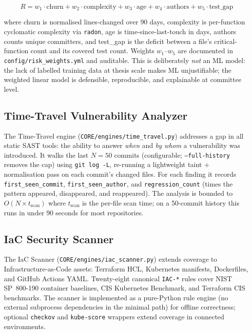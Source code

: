 \begin{equation}
R = w_1 \cdot \text{churn} + w_2 \cdot \text{complexity} + w_3 \cdot \text{age} + w_4 \cdot \text{authors} + w_5 \cdot \text{test\_gap}
\end{equation}

where churn is normalised lines-changed over 90 days, complexity is per-function cyclomatic complexity via \texttt{radon}, age is time-since-last-touch in days, authors counts unique committers, and test\_gap is the deficit between a file's critical-function count and its covered test count. Weights $w_1$--$w_5$ are documented in \texttt{config/risk\_weights.yml} and auditable. This is deliberately \textit{not} an ML model: the lack of labelled training data at thesis scale makes ML unjustifiable; the weighted linear model is defensible, reproducible, and explainable at committee level.

\subsection{Time-Travel Vulnerability Analyzer}
\label{sec:time_travel_design}

The Time-Travel engine (\texttt{CORE/engines/time\_travel.py}) addresses a gap in all static SAST tools: the ability to answer \textit{when} and \textit{by whom} a vulnerability was introduced. It walks the last $N = 50$ commits (configurable; \texttt{--full-history} removes the cap) using \texttt{git log -L}, re-running a lightweight taint + normalisation pass on each commit's changed files. For each finding it records \texttt{first\_seen\_commit}, \texttt{first\_seen\_author}, and \texttt{regression\_count} (times the pattern appeared, disappeared, and reappeared). The analysis is bounded to $O(N \times t_{\text{scan}})$ where $t_{\text{scan}}$ is the per-file scan time; on a 50-commit history this runs in under 90 seconds for most repositories.

\subsection{IaC Security Scanner}
\label{sec:iac_design}

The IaC Scanner (\texttt{CORE/engines/iac\_scanner.py}) extends coverage to Infrastructure-as-Code assets: Terraform HCL, Kubernetes manifests, Dockerfiles, and GitHub Actions YAML. Twenty-eight canonical \texttt{IAC-*} rules cover NIST SP~800-190 container baselines, CIS Kubernetes Benchmark, and Terraform CIS benchmarks. The scanner is implemented as a pure-Python rule engine (no external subprocess dependencies in the minimal path) for offline correctness; optional \texttt{checkov} and \texttt{kube-score} wrappers extend coverage in connected environments.

